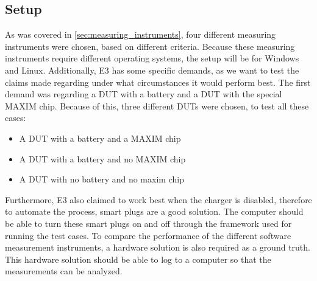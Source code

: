 \subsection{Setup}

As was covered in \cref{sec:measuring_instruments}, four different measuring instruments were chosen, based on different criteria. Because these measuring instruments require different operating systems, the setup will be for Windows and Linux. Additionally, E3 has some specific demands, as we want to test the claims made regarding under what circumstances it would perform best\cite{E3Doc,E3Video}. The first demand was regarding a DUT with a battery and a DUT with the special MAXIM chip. Because of this, three different DUTs were chosen, to test all these cases:

\begin{itemize}
    \item A DUT with a battery and a MAXIM chip
    \item A DUT with a battery and no MAXIM chip
    \item A DUT with no battery and no maxim chip
\end{itemize}

Furthermore, E3 also claimed to work best when the charger is disabled\cite{E3Doc}, therefore to automate the process, smart plugs are a good solution. The computer should be able to turn these smart plugs on and off through the framework used for running the test cases. To compare the performance of the different software measurement instruments, a hardware solution is also required as a ground truth. This hardware solution should be able to log to a computer so that the measurements can be analyzed.